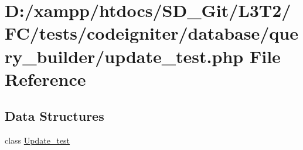 \hypertarget{update__test_8php}{}\section{D\+:/xampp/htdocs/\+S\+D\+\_\+\+Git/\+L3\+T2/\+F\+C/tests/codeigniter/database/query\+\_\+builder/update\+\_\+test.php File Reference}
\label{update__test_8php}
\subsection*{Data Structures}
\begin{DoxyCompactItemize}
\item 
class \hyperlink{class_update__test}{Update\+\_\+test}
\end{DoxyCompactItemize}
